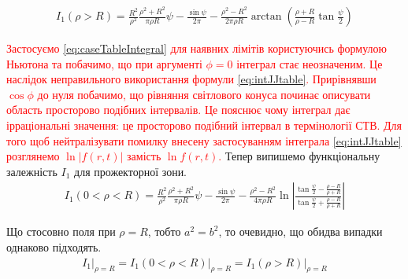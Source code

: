 %
\begin{equation*} \begin{aligned}
I_1 \left( \rho > R \right) = 
\frac{R^2}{\rho^2} \frac{\rho^2 + R^2}{\pi \rho R} \psi - 
\frac{\sin \psi}{2 \pi} - \frac{\rho^2 - R^2}{2 \pi \rho R} 
\arctan \left( \frac{\rho + R}{\rho - R} \tan \frac{\psi}{2} \right)
\end{aligned} \end{equation*}

\textcolor{red}{ Застосуємо \eqref{eq:caseTableIntegral} для наявних лімітів 
користуючись формулою Ньютона та побачимо, що при аргументі $ \phi = 0 $ інтеграл 
стає неозначеним. Це наслідок неправильного використання формули 
\eqref{eq:intJJtable}. Прирівнявши $ \cos \phi $ до нуля побачимо, що рівняння 
світлового конуса починає описувати область просторово подібних інтервалів. Це 
пояснює чому інтеграл дає ірраціональні значення: це просторово подібний інтервал в 
термінології СТВ. Для того щоб нейтралізувати помилку внесену застосуванням 
інтеграла \eqref{eq:intJJtable} розглянемо $ \ln |f(r,t)| $ замість 
$ \ln f(r,t) $.} Тепер випишемо функціональну залежність $ I_1 $ для прожекторної 
зони.
%
\begin{equation*} \begin{aligned}
I_1 \left( 0 < \rho < R \right) = 
\frac{R^2}{\rho^2} \frac{\rho^2 + R^2}{\pi \rho R} \psi - 
\frac{\sin \psi}{2 \pi} - \frac{\rho^2 - R^2}{4 \pi \rho R} 
\ln \left| \frac{\tan \frac{\psi}{2} - \frac{\rho - R}{\rho + R}}
{\tan \frac{\psi}{2} + \frac{\rho - R}{\rho + R}} \right|
\end{aligned} \end{equation*}

Що стосовно поля при $ \rho = R $, тобто $ a^2 = b^2 $, то очевидно, що обидва 
випадки однаково підходять.
%
\begin{equation*} \begin{aligned}
\left. I_1 \right|_{\rho = R} = 
\left. I_1 \left(0 < \rho < R \right) \right|_{\rho = R} =
\left. I_1 \left( \rho > R \right) \right|_{\rho = R}
\end{aligned} \end{equation*}

